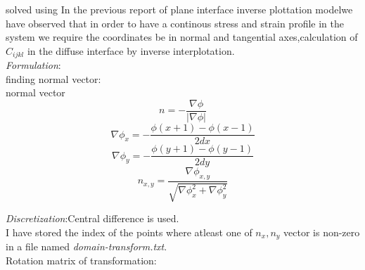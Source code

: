 \documentclass[a4paper,12pt]{article}
\begin{document}
solved using 
In the previous report of plane interface inverse plottation modelwe have observed that in order to have a continous stress and strain profile in the system we require the coordinates be in normal and tangential axes,calculation of $C_{ijkl}$ in the diffuse interface by inverse interplotation.\\
\noindent \emph{Formulation}:\\
 
\noindent finding normal vector:\\ 
normal vector\\
\begin{equation}
 n=-\frac{\nabla\phi}{|\nabla\phi|}
\end{equation}
\begin{equation}
\nabla\phi_{x}=-\frac{\phi(x+1)-\phi(x-1)}{2dx}
\end{equation}
\begin{equation}
\nabla\phi_{y}=-\frac{\phi(y+1)-\phi(y-1)}{2dy}
\end{equation}
\begin{equation}
n_{x,y}=\frac{\nabla\phi_{x,y}}{\sqrt{\nabla\phi_{x}^2+\nabla\phi_{y}^2}}
\end{equation}
\begin{center}
\end{center}
\emph{Discretization}:Central difference is used.\\
I have stored the index of the points where atleast one of $n_{x},n_{y}$ vector is non-zero in a file named \emph{domain-transform.txt}.\\
Rotation matrix of transformation:\\
\end{document}

